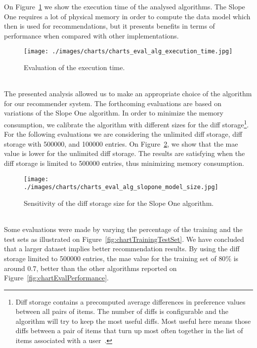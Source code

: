 On Figure~\ref{fig:chartExecutionTime} we show the execution time of the analysed algorithms. The Slope One requires a lot of physical memory in order to compute the data model which then is used for recommendations, but it presents benefits in terms of performance when compared with other implementations.\\
\begin{figure}[h!]
 \centering
   \texttt{[image: ./images/charts/charts\_eval\_alg\_execution\_time.jpg]}
   \caption{Evaluation of the execution time.}
   \label{fig:chartExecutionTime}
\end{figure}\\
The presented analysis allowed us to make an appropriate choice of the algorithm for our recommender system. The forthcoming evaluations are based on variations of the Slope One algorithm. In order to minimize the memory consumption, we calibrate the algorithm with different sizes for the diff storage\footnote{Diff storage contains a precomputed average differences in preference values between all pairs of items. The number of diffs is configurable and the algorithm will try to keep the most useful diffs. Most useful here means those diffs between a pair of items that turn up most often together in the list of items associated with a user~\cite{mahoutInAction}.}. For the following evaluations we are considering the unlimited diff storage, diff storage with 500000, and 100000 entries. On Figure~\ref{fig:chartSlopeOneModeSize}, we show that the \gls{mae} value is lower for the unlimited diff storage. The results are satisfying when the diff storage is limited to 500000 entries, thus minimizing memory consumption.\\
\begin{figure}[h!]
 \centering
   \texttt{[image: ./images/charts/charts\_eval\_alg\_slopone\_model\_size.jpg]}
   \caption{Sensitivity of the diff storage size for the Slope One algorithm.}
   \label{fig:chartSlopeOneModeSize}
\end{figure}\\
Some evaluations were made by varying the percentage of the training and the test sets as illustrated on Figure~\ref{fig:chartTrainingTestSet}. We have concluded that a larger dataset implies better recommendation results. By using the diff storage limited to 500000 entries, the \gls{mae} value for the training set of $80\%$ is around $0.7$, better than the other algorithms reported on Figure~\ref{fig:chartEvalPerformance}.\\
